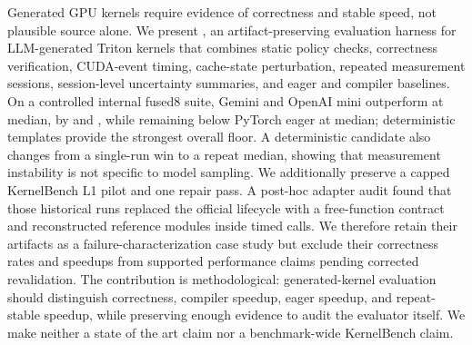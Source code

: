 Generated GPU kernels require evidence of correctness and stable speed, not plausible source alone. We present \okf{}, an artifact-preserving evaluation harness for LLM-generated Triton kernels that combines static policy checks, correctness verification, CUDA-event timing, cache-state perturbation, repeated measurement sessions, session-level uncertainty summaries, and eager and compiler baselines. On a controlled internal fused8 suite, Gemini and OpenAI mini outperform \compile{} at median, by  and , while remaining below PyTorch eager at median; deterministic templates provide the strongest overall floor. A deterministic  candidate also changes from a  single-run win to a  repeat median, showing that measurement instability is not specific to model sampling. We additionally preserve a capped KernelBench L1 pilot and one repair pass. A post-hoc adapter audit found that those historical runs replaced the official  lifecycle with a free-function contract and reconstructed reference modules inside timed calls. We therefore retain their artifacts as a failure-characterization case study but exclude their correctness rates and speedups from supported performance claims pending corrected revalidation. The contribution is methodological: generated-kernel evaluation should distinguish correctness, compiler speedup, eager speedup, and repeat-stable speedup, while preserving enough evidence to audit the evaluator itself. We make neither a state of the art claim nor a benchmark-wide KernelBench claim.
